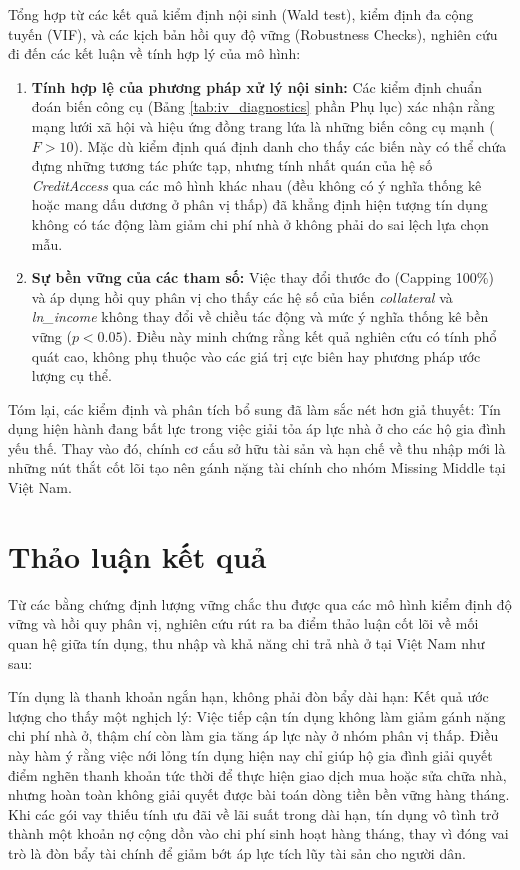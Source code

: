 \documentclass[12pt,a4paper]{report}
\begin{document}
Tổng hợp từ các kết quả kiểm định nội sinh (Wald test), kiểm định đa cộng tuyến (VIF), và các kịch bản hồi quy độ vững (Robustness Checks), nghiên cứu đi đến các kết luận về tính hợp lý của mô hình:

\begin{enumerate}
	\item \textbf{Tính hợp lệ của phương pháp xử lý nội sinh:} Các kiểm định chuẩn đoán biến công cụ (Bảng \ref{tab:iv_diagnostics} phần Phụ lục) xác nhận rằng mạng lưới xã hội và hiệu ứng đồng trang lứa là những biến công cụ mạnh ($F > 10$). Mặc dù kiểm định quá định danh cho thấy các biến này có thể chứa đựng những tương tác phức tạp, nhưng tính nhất quán của hệ số \textit{CreditAccess} qua các mô hình khác nhau (đều không có ý nghĩa thống kê hoặc mang dấu dương ở phân vị thấp) đã khẳng định hiện tượng tín dụng không có tác động làm giảm chi phí nhà ở không phải do sai lệch lựa chọn mẫu. 
	
	\item \textbf{Sự bền vững của các tham số:} Việc thay đổi thước đo (Capping 100\%) và áp dụng hồi quy phân vị cho thấy các hệ số của biến \textit{collateral} và \textit{ln\_income} không thay đổi về chiều tác động và mức ý nghĩa thống kê bền vững ($p < 0.05$). Điều này minh chứng rằng kết quả nghiên cứu có tính phổ quát cao, không phụ thuộc vào các giá trị cực biên hay phương pháp ước lượng cụ thể.
\end{enumerate}

Tóm lại, các kiểm định và phân tích bổ sung đã làm sắc nét hơn giả thuyết: Tín dụng hiện hành đang bất lực trong việc giải tỏa áp lực nhà ở cho các hộ gia đình yếu thế. Thay vào đó, chính cơ cấu sở hữu tài sản và hạn chế về thu nhập mới là những nút thắt cốt lõi tạo nên gánh nặng tài chính cho nhóm Missing Middle tại Việt Nam.

\section{Thảo luận kết quả}

Từ các bằng chứng định lượng vững chắc thu được qua các mô hình kiểm định độ vững và hồi quy phân vị, nghiên cứu rút ra ba điểm thảo luận cốt lõi về mối quan hệ giữa tín dụng, thu nhập và khả năng chi trả nhà ở tại Việt Nam như sau:

Tín dụng là thanh khoản ngắn hạn, không phải đòn bẩy dài hạn: Kết quả ước lượng cho thấy một nghịch lý: Việc tiếp cận tín dụng không làm giảm gánh nặng chi phí nhà ở, thậm chí còn làm gia tăng áp lực này ở nhóm phân vị thấp. Điều này hàm ý rằng việc nới lỏng tín dụng hiện nay chỉ giúp hộ gia đình giải quyết điểm nghẽn thanh khoản tức thời để thực hiện giao dịch mua hoặc sửa chữa nhà, nhưng hoàn toàn không giải quyết được bài toán dòng tiền bền vững hàng tháng. Khi các gói vay thiếu tính ưu đãi về lãi suất trong dài hạn, tín dụng vô tình trở thành một khoản nợ cộng dồn vào chi phí sinh hoạt hàng tháng, thay vì đóng vai trò là đòn bẩy tài chính để giảm bớt áp lực tích lũy tài sản cho người dân.
	
\end{document}
